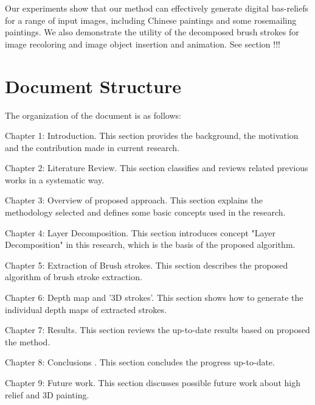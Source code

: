 Our experiments show that our method can effectively generate digital bas-reliefs for a range of input images, including Chinese paintings and some rosemailing paintings. 
We also demonstrate the utility of the decomposed brush strokes for image recoloring and image object insertion and animation. See section !!! 


\section{Document Structure}
The organization of the document is as follows:

Chapter 1: Introduction. This section provides the background, the motivation and the contribution made in current research.

Chapter 2: Literature Review. This section classifies and reviews related previous works  in a systematic way.

Chapter 3: Overview of proposed approach. This section explains the methodology selected and defines some basic concepts used in the research.

Chapter 4: Layer Decomposition. This section introduces concept "Layer Decomposition" in this research, which is the basis of the proposed algorithm.

Chapter 5: Extraction of Brush strokes. This section describes the proposed algorithm of brush stroke extraction.

Chapter 6: Depth map and '3D strokes'.  This section shows how to generate the individual depth maps of extracted strokes. 

Chapter 7: Results. This section reviews the up-to-date results based on proposed the method.

Chapter 8: Conclusions . This section concludes the progress up-to-date.

Chapter 9: Future work. This section discusses possible future work about high relief and 3D painting.

\newpage